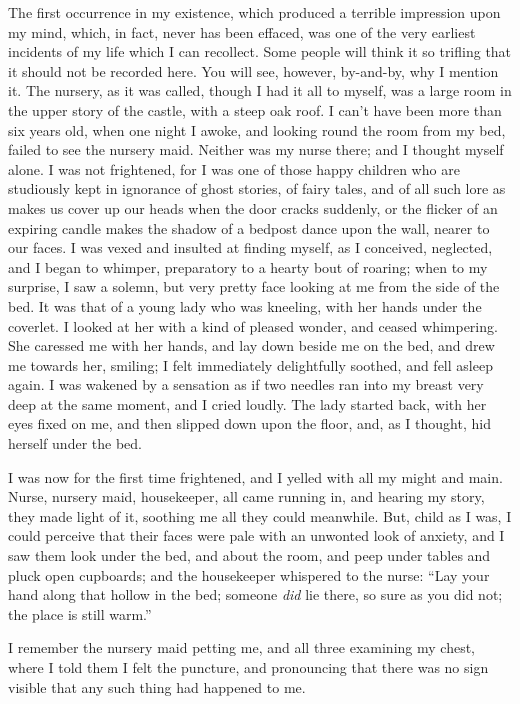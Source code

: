 \documentclass[11pt,twoside,makeidx,hidelinks,]{memoir}
\begin{document}
The first occurrence in my existence, which produced a terrible
impression upon my mind, which, in fact, never has been effaced, was one
of the very earliest incidents of my life which I can recollect. Some
people will think it so trifling that it should not be recorded here.
You will see, however, by-and-by, why I mention it. The nursery, as it
was called, though I had it all to myself, was a large room in the upper
story of the castle, with a steep oak roof. I can't have been more than
six years old, when one night I awoke, and looking round the room from
my bed, failed to see the nursery maid. Neither was my nurse there; and
I thought myself alone. I was not frightened, for I was one of those
happy children who are studiously kept in ignorance of ghost stories, of
fairy tales, and of all such lore as makes us cover up our heads when
the door cracks suddenly, or the flicker of an expiring candle makes the
shadow of a bedpost dance upon the wall, nearer to our faces. I was
vexed and insulted at finding myself, as I conceived, neglected, and I
began to whimper, preparatory to a hearty bout of roaring; when to my
surprise, I saw a solemn, but very pretty face looking at me from the
side of the bed. It was that of a young lady who was kneeling, with her
hands under the coverlet. I looked at her with a kind of pleased wonder,
and ceased whimpering. She caressed me with her hands, and lay down
beside me on the bed, and drew me towards her, smiling; I felt
immediately delightfully soothed, and fell asleep again. I was wakened
by a sensation as if two needles ran into my breast very deep at the
same moment, and I cried loudly. The lady started back, with her eyes
fixed on me, and then slipped down upon the floor, and, as I thought,
hid herself under the bed.

I was now for the first time frightened, and I yelled with all my might
and main. Nurse, nursery maid, housekeeper, all came running in, and
hearing my story, they made light of it, soothing me all they could
meanwhile. But, child as I was, I could perceive that their faces were
pale with an unwonted look of anxiety, and I saw them look under the
bed, and about the room, and peep under tables and pluck open cupboards;
and the housekeeper whispered to the nurse: ``Lay your hand along that
hollow in the bed; someone \emph{did} lie there, so sure as you did not; the
place is still warm.''

I remember the nursery maid petting me, and all three examining my
chest, where I told them I felt the puncture, and pronouncing that there
was no sign visible that any such thing had happened to me.
\end{document}
